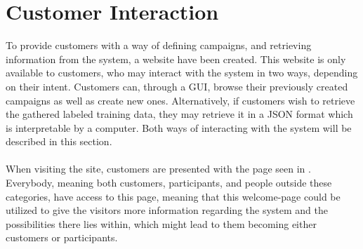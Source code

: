 
\section{Customer Interaction}
\label{sec:customer_interaction}

To provide customers with a way of defining campaigns, and retrieving information from the system, a website have been created. This website is only available to customers, who may interact with the system in two ways, depending on their intent. Customers can, through a GUI, browse their previously created campaigns as well as create new ones. Alternatively, if customers wish to retrieve the gathered labeled training data, they may retrieve it in a JSON format which is interpretable by a computer. Both ways of interacting with the system will be described in this section.
\\\\
When visiting the site, customers are presented with the page seen in . Everybody, meaning both customers, participants, and people outside these categories, have access to this page, meaning that this welcome-page could be utilized to give the visitors more information regarding the system and the possibilities there lies within, which might lead to them becoming either customers or participants. 





